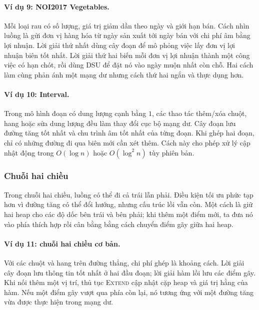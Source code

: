 \documentclass[11pt]{article}
\begin{document}
\paragraph{Ví dụ 9: NOI2017 Vegetables.}
Mỗi loại rau có số lượng, giá trị giảm dần theo ngày và giới hạn bán. Cách nhìn
luồng là gửi đơn vị hàng hóa từ ngày sản xuất tới ngày bán với chi phí âm bằng
lợi nhuận. Lời giải thứ nhất dùng cây đoạn để mô phỏng việc lấy đơn vị lợi
nhuận biên tốt nhất. Lời giải thứ hai biến mỗi đơn vị lợi nhuận thành một công
việc có hạn chót, rồi dùng DSU để đặt nó vào ngày muộn nhất còn chỗ. Hai cách
làm cùng phản ánh một mạng dư nhưng cách thứ hai ngắn và thực dụng hơn.

\paragraph{Ví dụ 10: Interval.}
Trong mô hình đoạn có dung lượng cạnh bằng $1$, các thao tác thêm/xóa chuột,
hang hoặc sửa dung lượng đều làm thay đổi cục bộ mạng dư. Cây đoạn lưu đường
tăng tốt nhất và chu trình âm tốt nhất của từng đoạn. Khi ghép hai đoạn, chỉ có
những đường đi qua biên mới cần xét thêm. Cách này cho phép xử lý cập nhật động
trong $O(\log n)$ hoặc $O(\log^2 n)$ tùy phiên bản.

\subsubsection{Chuỗi hai chiều}

Trong chuỗi hai chiều, luồng có thể đi cả trái lẫn phải. Điều kiện tối ưu phức
tạp hơn vì đường tăng có thể đổi hướng, nhưng cấu trúc lồi vẫn còn. Một cách
là giữ hai heap cho các độ dốc bên trái và bên phải; khi thêm một điểm mới, ta
đưa nó vào phía thích hợp rồi cân bằng bằng cách chuyển điểm gãy giữa hai heap.

\paragraph{Ví dụ 11: chuỗi hai chiều cơ bản.}
Với các chuột và hang trên đường thẳng, chi phí ghép là khoảng cách. Lời giải
cây đoạn lưu thông tin tốt nhất ở hai đầu đoạn; lời giải hàm lồi lưu các điểm
gãy. Khi nối thêm một vị trí, thủ tục \textsc{Extend} cập nhật cặp heap và giá
trị hằng của hàm. Nếu một điểm gãy vượt qua phía còn lại, nó tương ứng với một
đường tăng vừa được thực hiện trong mạng dư.
\end{document}
